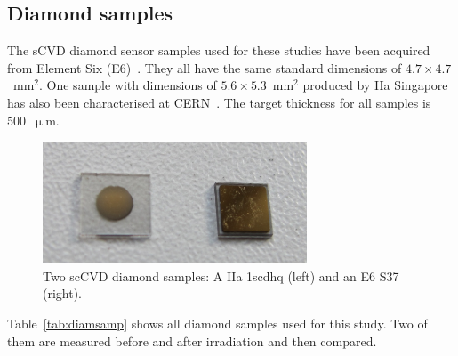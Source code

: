 \subsection{Diamond samples}
\label{sec:diamsam}
The sCVD diamond sensor samples used for these studies have been acquired from Element Six (E6)~\cite{E6:00000}. They all have the same standard dimensions of $4.7\times4.7$~mm$^2$. %
One sample with dimensions of $5.6\times5.3$~mm$^2$ produced by IIa Singapore~\cite{IIA:00000} has also been characterised at CERN~\cite{IIa:00001}. The target thickness for all samples is 500~$\upmu$m. %
\begin{figure}
\centering
\includegraphics[width=0.7\textwidth]{03_measurement_results/pics/setup/diamond4}
\caption{Two scCVD diamond samples: A IIa 1scdhq (left) and an E6 S37 (right).}
\label{fig:diams}
\end{figure}
Table~\ref{tab:diamsamp} shows all diamond samples used for this study. Two of them are measured before and after irradiation and then compared. %

